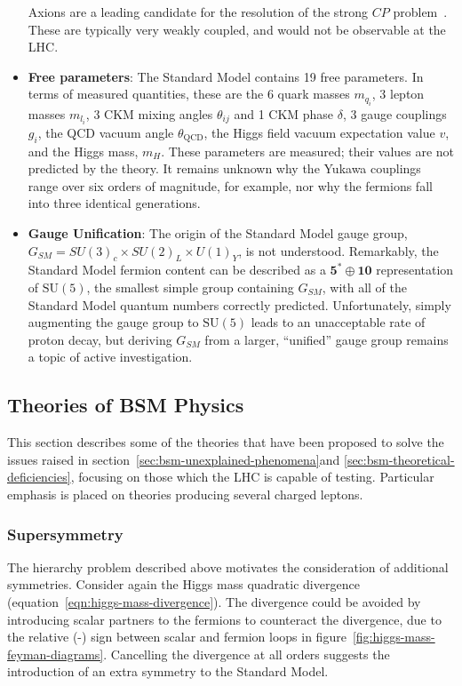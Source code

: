\begin{itemize}
	Axions are a leading candidate for the resolution of the strong $CP$ problem~\cite{Peccei:400569}. These are typically very weakly coupled, and would not be observable at the LHC.

	\item \textbf{Free parameters}: The Standard Model contains 19 free parameters. In terms of measured quantities, these are the 6 quark masses $m_{q_i}$, 3 lepton masses $m_{l_i}$, 3 CKM mixing angles $\theta_{ij}$ and 1 CKM phase $\delta$, 3 gauge couplings $g_i$, the QCD vacuum angle $\theta_{\mathrm{QCD}}$, the Higgs field vacuum expectation value $v$, and the Higgs mass, $m_H$. These parameters are measured; their values are not predicted by the theory. It remains unknown why the Yukawa couplings range over six orders of magnitude, for example, nor why the fermions fall into three identical generations. 


	\item \textbf{Gauge Unification}: The origin of the Standard Model gauge group, $G_{SM}=SU(3)_c\times SU(2)_L \times U(1)_Y$, is not understood. Remarkably, the Standard Model fermion content can be described as a $\mathbf{5}^{*}\oplus \mathbf{10}$ representation of $\mathrm{SU}(5)$, the smallest simple group containing $G_{SM}$, with all of the Standard Model quantum numbers correctly predicted. Unfortunately, simply augmenting the gauge group to $\mathrm{SU}(5)$ leads to an unacceptable rate of proton decay, but deriving $G_{SM}$ from a larger, ``unified'' gauge group remains a topic of active investigation.  
\end{itemize}

\subsection{Theories of BSM Physics}\label{sec:bsm-theories}
This section describes some of the theories that have been proposed to solve the issues raised in section~\ref{sec:bsm-unexplained-phenomena}and \ref{sec:bsm-theoretical-deficiencies}, focusing on those which the LHC is capable of testing. Particular emphasis is placed on theories producing several charged leptons. 

\subsubsection{Supersymmetry}
The hierarchy problem described above motivates the consideration of additional symmetries. Consider again the Higgs mass quadratic divergence (equation~\ref{eqn:higgs-mass-divergence}). The divergence could be avoided by introducing scalar partners to the fermions to counteract the divergence, due to the relative (-) sign between scalar and fermion loops in figure~\ref{fig:higgs-mass-feyman-diagrams}. Cancelling the divergence at all orders suggests the introduction of an extra symmetry to the Standard Model. 


